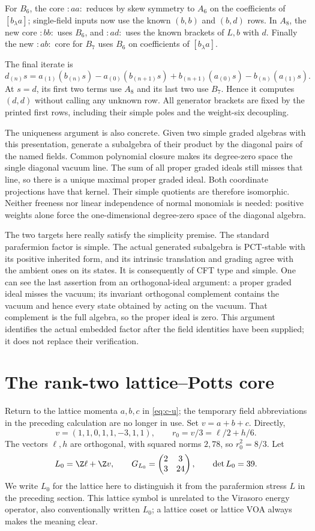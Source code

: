 For $B_6$, the core $:aa:$ reduces by skew symmetry to $A_6$
on the coefficients of $[b_\lambda a]$; single-field inputs
now use the known $(b,b)$ and $(b,d)$ rows. In $A_8$, the new
core $:bb:$ uses $B_6$, and $:ad:$ uses the known brackets
of $L,b$ with $d$. Finally the new $:ab:$ core for $B_7$
uses $B_6$ on coefficients of $[b_\lambda a]$.

The final iterate is
\[
 d_{(n)}s=a_{(1)}(b_{(n)}s)-a_{(0)}(b_{(n+1)}s)
       +b_{(n+1)}(a_{(0)}s)-b_{(n)}(a_{(1)}s).
\]
At $s=d$, its first two terms use $A_8$ and its last two use
$B_7$. Hence it computes $(d,d)$ without calling any unknown
row. All generator brackets are fixed by the printed first rows,
including their simple poles and the weight-six decoupling.

The uniqueness argument is also concrete. Given two simple graded
algebras with this presentation, generate a subalgebra of their product
by the diagonal pairs of the named fields. Common polynomial closure
makes its degree-zero space the single diagonal vacuum line. The sum
of all proper graded ideals still misses that line, so there is a
unique maximal proper graded ideal. Both coordinate projections have
that kernel. Their simple quotients are therefore isomorphic.
Neither freeness nor linear independence of normal monomials is
needed: positive weights alone force the one-dimensional degree-zero
space of the diagonal algebra.

The two targets here really satisfy the simplicity premise.
The standard parafermion factor is simple. The actual generated
subalgebra is PCT-stable with its positive inherited form, and its
intrinsic translation and grading agree with the ambient ones on its
states. It is consequently of CFT type and simple. One can see the
last assertion from an orthogonal-ideal argument: a proper graded
ideal misses the vacuum; its invariant orthogonal complement contains
the vacuum and hence every state obtained by acting on the vacuum.
That complement is the full algebra, so the proper ideal is zero.
This argument identifies the actual embedded factor after the field
identities have been supplied; it does not replace their verification.

\section{The rank-two lattice--Potts core}

Return to the lattice momenta $a,b,c$ in \eqref{eq:c-u};
the temporary field abbreviations in the preceding calculation
are no longer in use. Set $v=a+b+c$. Directly,
\[
 v=(1,1,0,1,1,-3,1,1),\qquad
 r_0=v/3=\ell/2+h/6.
\]
The vectors $\ell,h$ are orthogonal, with squared norms $2,78$, so
$r_0^2=8/3$. Let
\[
 L_0=\Z\ell+\Z v,
 \qquad G_{L_0}=\begin{pmatrix}2&3\\3&24\end{pmatrix},
 \qquad\det L_0=39.
\]
We write $L_0$ for the lattice here to distinguish it from the
parafermion stress $L$ in the preceding section. This lattice symbol
is unrelated to the Virasoro energy operator, also conventionally
written $L_0$; a lattice coset or lattice VOA always makes the meaning clear.

